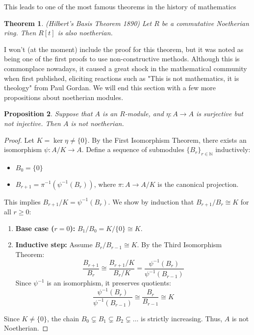 \documentclass[12pt]{book}
\newtheorem{theorem}{Theorem}[chapter]
\newtheorem{proposition}[theorem]{Proposition}
\theoremstyle{definition}
\begin{document}
This leads to one of the most famous theorems in the history of mathematics

\begin{theorem}
    (Hilbert's Basis Theorem 1890) Let $R$ be a commutative Noetherian ring. Then $R[t]$ is also noetherian. 
\end{theorem}

I won't (at the moment) include the proof for this theorem, but it was noted as being one of the first proofs to use non-constructive methods. Although this is commonplace nowadays, it caused a great shock in the mathematical community when first published, eliciting reactions such as "This is not mathematics, it is theology" from Paul Gordan. We will end this section with a few more propositions about noetherian modules. 

\begin{proposition}
    Suppose that $A$ is an $R$-module, and $\eta : A \to A$ is surjective but not injective. Then $A$ is not noetherian. 
\end{proposition}
\begin{proof}
Let $K = \ker \eta \neq \{0\}$. By the First Isomorphism Theorem, there exists an isomorphism $\psi: A/K \to A$. Define a sequence of submodules $\{B_r\}_{r \in \mathbb{N}}$ inductively:
\begin{itemize}
    \item $B_0 = \{0\}$
    \item $B_{r+1} = \pi^{-1}(\psi^{-1}(B_r))$, where $\pi: A \to A/K$ is the canonical projection.
\end{itemize}
This implies $B_{r+1}/K = \psi^{-1}(B_r)$. We show by induction that $B_{r+1}/B_r \cong K$ for all $r \geq 0$:
\begin{enumerate}
    \item \textbf{Base case ($r=0$):} $B_1/B_0 = K/\{0\} \cong K$.
    \item \textbf{Inductive step:} Assume $B_r/B_{r-1} \cong K$. By the Third Isomorphism Theorem:
    \[ \frac{B_{r+1}}{B_r} \cong \frac{B_{r+1}/K}{B_r/K} = \frac{\psi^{-1}(B_r)}{\psi^{-1}(B_{r-1})} \]
    Since $\psi^{-1}$ is an isomorphism, it preserves quotients:
    \[ \frac{\psi^{-1}(B_r)}{\psi^{-1}(B_{r-1})} \cong \frac{B_r}{B_{r-1}} \cong K \]
\end{enumerate}
Since $K \neq \{0\}$, the chain $B_0 \subsetneq B_1 \subsetneq B_2 \subsetneq \dots$ is strictly increasing. Thus, $A$ is not Noetherian.
\end{proof}
\end{document}
